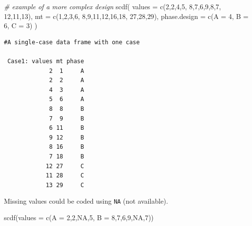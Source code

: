 \documentclass[
]{book}
\newenvironment{Shaded}{\begin{snugshade}}{\end{snugshade}}
\newcommand{\AttributeTok}[1]{\textcolor[rgb]{0.77,0.63,0.00}{#1}}
\newcommand{\CommentTok}[1]{\textcolor[rgb]{0.56,0.35,0.01}{\textit{#1}}}
\newcommand{\ConstantTok}[1]{\textcolor[rgb]{0.00,0.00,0.00}{#1}}
\newcommand{\DecValTok}[1]{\textcolor[rgb]{0.00,0.00,0.81}{#1}}
\newcommand{\FunctionTok}[1]{\textcolor[rgb]{0.00,0.00,0.00}{#1}}
\newcommand{\NormalTok}[1]{#1}
\begin{document}
\begin{Shaded}
\begin{Highlighting}[]
\CommentTok{\# example of a more complex design }
\FunctionTok{scdf}\NormalTok{(}
  \AttributeTok{values =} \FunctionTok{c}\NormalTok{(}\DecValTok{2}\NormalTok{,}\DecValTok{2}\NormalTok{,}\DecValTok{4}\NormalTok{,}\DecValTok{5}\NormalTok{, }\DecValTok{8}\NormalTok{,}\DecValTok{7}\NormalTok{,}\DecValTok{6}\NormalTok{,}\DecValTok{9}\NormalTok{,}\DecValTok{8}\NormalTok{,}\DecValTok{7}\NormalTok{, }\DecValTok{12}\NormalTok{,}\DecValTok{11}\NormalTok{,}\DecValTok{13}\NormalTok{), }
  \AttributeTok{mt =} \FunctionTok{c}\NormalTok{(}\DecValTok{1}\NormalTok{,}\DecValTok{2}\NormalTok{,}\DecValTok{3}\NormalTok{,}\DecValTok{6}\NormalTok{, }\DecValTok{8}\NormalTok{,}\DecValTok{9}\NormalTok{,}\DecValTok{11}\NormalTok{,}\DecValTok{12}\NormalTok{,}\DecValTok{16}\NormalTok{,}\DecValTok{18}\NormalTok{, }\DecValTok{27}\NormalTok{,}\DecValTok{28}\NormalTok{,}\DecValTok{29}\NormalTok{),}
  \AttributeTok{phase.design =} \FunctionTok{c}\NormalTok{(}\AttributeTok{A =} \DecValTok{4}\NormalTok{, }\AttributeTok{B =} \DecValTok{6}\NormalTok{, }\AttributeTok{C =} \DecValTok{3}\NormalTok{)}
\NormalTok{)}
\end{Highlighting}
\end{Shaded}

\begin{verbatim}
#A single-case data frame with one case

 Case1: values mt phase
             2  1     A
             2  2     A
             4  3     A
             5  6     A
             8  8     B
             7  9     B
             6 11     B
             9 12     B
             8 16     B
             7 18     B
            12 27     C
            11 28     C
            13 29     C
\end{verbatim}

Missing values could be coded using \texttt{NA} (not available).

\begin{Shaded}
\begin{Highlighting}[]
\FunctionTok{scdf}\NormalTok{(}\AttributeTok{values =} \FunctionTok{c}\NormalTok{(}\AttributeTok{A =} \DecValTok{2}\NormalTok{,}\DecValTok{2}\NormalTok{,}\ConstantTok{NA}\NormalTok{,}\DecValTok{5}\NormalTok{, }\AttributeTok{B =} \DecValTok{8}\NormalTok{,}\DecValTok{7}\NormalTok{,}\DecValTok{6}\NormalTok{,}\DecValTok{9}\NormalTok{,}\ConstantTok{NA}\NormalTok{,}\DecValTok{7}\NormalTok{))}
\end{Highlighting}
\end{Shaded}
\end{document}
